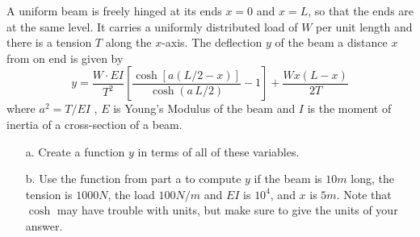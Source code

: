 {A uniform beam is freely hinged at its ends $x = 0$ and $x = L$, so that the ends are at the same level.  It carries a uniformly distributed load of $W$ per unit length and there is a tension $T$ along the $x$-axis.  The deflection $y$ of the beam a distance $x$ from on end is given by
\[
y = \frac{W \cdot EI}{T^2}\left[ \frac{\cosh\left[ a (L/2 - x)\right]}{\cosh(a\, L/2)} - 1 \right] 
+
\frac{W x(L-x)}{2T}
\]
where $a^2= T/EI$ , $E$ is Young's Modulus of the beam and $I$ is the moment of inertia of a cross-section of a beam.  
\begin{enumerate}
\item[a.] Create a function $y$ in terms of all of these variables.
\item[b.] Use the function from part a to compute $y$ if the beam is $10 m$ long, the tension is $1000N$, the load $100 N/m$ and $EI$ is $10^4$, and $x$ is $5 m$. Note that $\cosh$ may have trouble with units, but make sure to give the units of your answer.
\end{enumerate}
}
{}